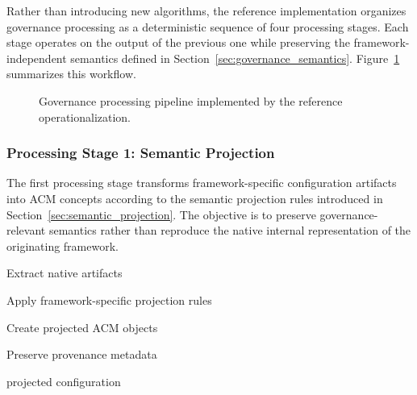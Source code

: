 \documentclass[10pt]{article}
\begin{document}
Rather than introducing new algorithms, the reference implementation organizes governance processing as a deterministic sequence of four processing stages. Each stage operates on the output of the previous one while preserving the framework-independent semantics defined in Section~\ref{sec:governance_semantics}. Figure~\ref{fig:governance_processing_pipeline} summarizes this workflow.

\begin{figure}[ht]
\centering
{}

\caption{Governance processing pipeline implemented by the reference operationalization.}
\label{fig:governance_processing_pipeline}
\end{figure}

\subsubsection{Processing Stage 1: Semantic Projection}

The first processing stage transforms framework-specific configuration artifacts into ACM concepts according to the semantic projection rules introduced in Section~\ref{sec:semantic_projection}. The objective is to preserve governance-relevant semantics rather than reproduce the native internal representation of the originating framework.

\begin{algorithm}[ht]
\caption{Semantic Projection}

Extract native artifacts\;

Apply framework-specific projection rules\;

Create projected ACM objects\;

Preserve provenance metadata\;

\Return projected configuration\;

\end{algorithm}
\end{document}
